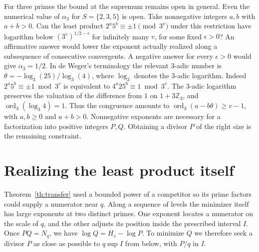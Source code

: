 \documentclass[11pt]{article}
\newcommand{\Z}{\mathbb Z}
\begin{document}
For three primes the bound at the supremum remains open in general.
Even the numerical value of $\alpha_3$ for $S=\{2,3,5\}$ is open.
Take nonnegative integers $a,b$ with $a+b>0$. Can the
least product $2^a5^b\equiv\pm1\pmod{3^v}$ under this restriction have
logarithm below $(3^v)^{1/2-\epsilon}$ for infinitely many $v$, for
some fixed $\epsilon>0$? An affirmative answer would lower the exponent
actually realized along a subsequence of consecutive convergents.
A negative answer for every $\epsilon>0$ would give $\alpha_3=1/2$.
In de Weger's terminology the relevant $3$-adic number is
$\theta=-\log_3(25)/\log_3(4)$, where $\log_3$ denotes the $3$-adic
logarithm. Indeed $2^a5^b\equiv\pm1\bmod 3^v$ is equivalent to
$4^a25^b\equiv1\bmod 3^v$. The $3$-adic logarithm preserves the valuation
of the difference from $1$ on $1+3\Z_3$, and
$\operatorname{ord}_3(\log_3 4)=1$. Thus the congruence amounts to
$\operatorname{ord}_3(a-b\theta)\ge v-1$, with $a,b\ge0$ and $a+b>0$.
Nonnegative exponents are necessary for a factorization into positive
integers $P,Q$. Obtaining a divisor $P$ of the right size is the remaining
constraint.

\section{Realizing the least product itself}\label{sec:exact}
Theorem~\ref{th:transfer} used a bounded power of a competitor so its
prime factors could supply a numerator near $q$. Along a sequence of
levels the minimizer itself has large exponents at two distinct primes.
One exponent locates a numerator on the scale of $q$, and the other
adjusts its position inside the prescribed interval $I$. Once $P Q=N_q$,
we have $\log Q=H_v-\log P$. To minimize $Q$ we therefore seek a divisor
$P$ as close as possible to $q\sup I$ from below, with $P/q$ in $I$.
\end{document}
